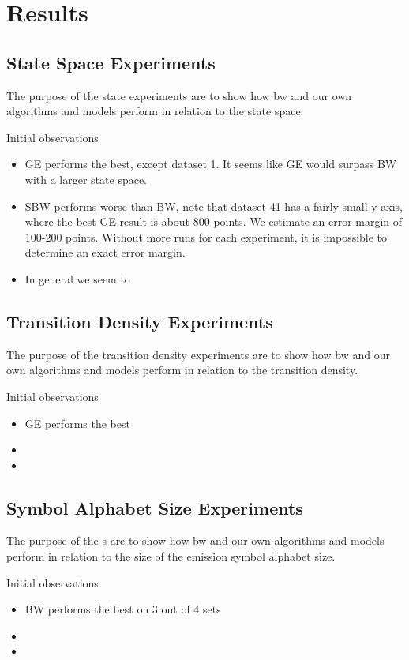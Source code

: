 \FloatBarrier

\section{Results}\label{sec:results}

\subsection{State Space Experiments}
The purpose of the state experiments are to show how \gls{bw} and our own algorithms and models perform in relation to the state space.
	

Initial observations
\begin{itemize}
\item GE performs the best, except dataset 1. It seems like GE would surpass BW with a larger state space.
\item SBW performs worse than BW, note that dataset 41 has a fairly small y-axis, where the best GE result is about 800 points. We estimate an error margin of 100-200 points. Without more runs for each experiment, it is impossible to determine an exact error margin.
\item In general we seem to 
\end{itemize}


\subsection{Transition Density Experiments}
The purpose of the transition density experiments are to show how \gls{bw} and our own algorithms and models perform in relation to the transition density.
	

Initial observations
\begin{itemize}
\item GE performs the best
\item 
\item 
\end{itemize}

\subsection{Symbol Alphabet Size Experiments}
The purpose of the s are to show how \gls{bw} and our own algorithms and models perform in relation to the size of the emission symbol alphabet size.
	
	
Initial observations
\begin{itemize}
\item BW performs the best on 3 out of 4 sets
\item 
\item 
\end{itemize}	
	
